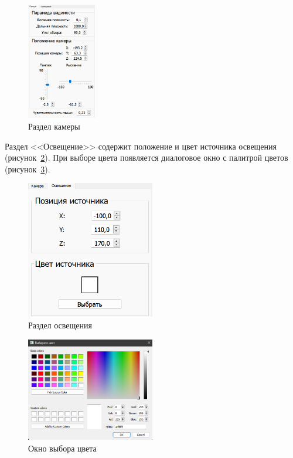 \begin{figure}[h]
	\centering
	\includegraphics[width=0.27\textwidth]{img/examples/camera.png}
	\caption{Раздел камеры}
	\label{fig:camera}
\end{figure}

Раздел <<Освещение>> содержит положение и цвет источника освещения (рисунок~\ref{fig:light}). 
При выборе цвета появляется диалоговое окно с палитрой цветов (рисунок~\ref{fig:сhoose-color}).

\begin{figure}[h]
	\centering
	\includegraphics[width=0.5\textwidth]{img/examples/light.png}
	\caption{Раздел освещения}
	\label{fig:light}
\end{figure}

\begin{figure}[h]
	\centering
	\includegraphics[width=0.5\textwidth]{img/examples/choose-color.png}
	\caption{Окно выбора цвета}
	\label{fig:сhoose-color}
\end{figure}


